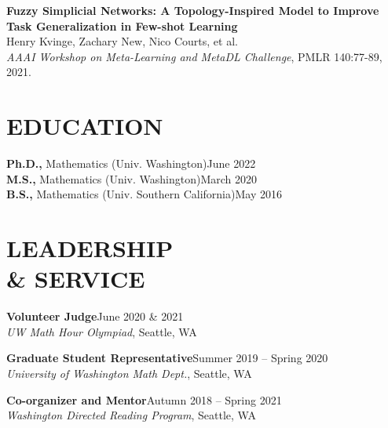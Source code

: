 \documentclass[margin]{res} %
\begin{document}
\begin{resume}
\textbf{Fuzzy Simplicial Networks: A Topology-Inspired Model to Improve Task Generalization in Few-shot Learning}\\
Henry Kvinge, Zachary New, Nico Courts, et al.\\
\textit{AAAI Workshop on Meta-Learning and MetaDL Challenge}, PMLR 140:77-89, 2021.


\section{EDUCATION}

{\bf Ph.D.,} Mathematics (Univ. Washington)\hfill June 2022 \\
{\bf M.S.,} Mathematics (Univ. Washington)\hfill March 2020 \\
{\bf B.S.,} Mathematics (Univ. Southern California)\hfill May 2016 


\section{LEADERSHIP \\\& SERVICE}
{\bf Volunteer Judge}\hfill June 2020 \& 2021\\
{\sl UW Math Hour Olympiad}, Seattle, WA

{\bf Graduate Student Representative}\hfill Summer 2019 -- Spring 2020\\
{\sl University of Washington Math Dept.}, Seattle, WA

{\bf Co-organizer and Mentor}\hfill Autumn 2018 -- Spring 2021\\
{\sl Washington Directed Reading Program}, Seattle, WA

\end{resume}
\end{document}
